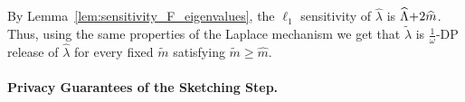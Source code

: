 \documentclass[11pt]{article}
\theoremstyle{definition}
\theoremstyle{plain}
\providecommand{\lemmaref}[1]{Lemma~\ref{#1}}
\newcommand{\reals}{\mathbb{R}}
\newcommand{\pG}{\pazocal{G}}
\newcommand{\pM}{\pazocal{M}}
\begin{document}
By \lemmaref{lem:sensitivity_F_eigenvalues}, the $\ell_1$ sensitivity of $\widehat{\lambda}$ is $\widehat{\Lambda} \hspace{-0.2em}+\hspace{-0.2em} 2\widehat{m}$. Thus, using the same properties of the Laplace mechanism we get that $\widetilde{\lambda}$ is $\frac{1}{\omega}$-DP release of $\widehat{\lambda}$ for every fixed $\widetilde{m}$ satisfying $\widetilde{m} \geq \widehat{m}$. 


\paragraph{Privacy Guarantees of the Sketching Step.}\ 
\end{document}
